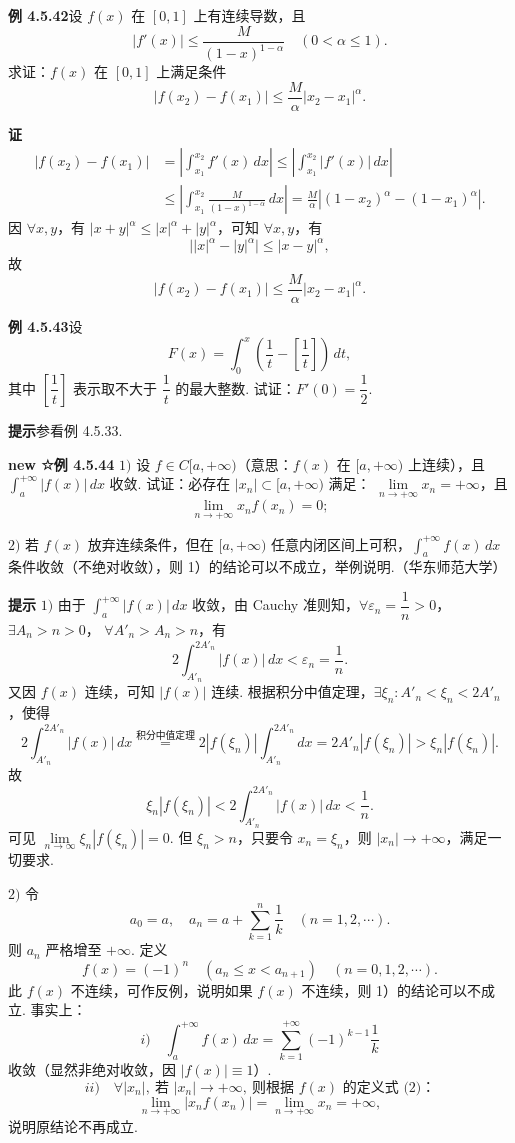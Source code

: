 \documentclass[UTF8,12pt,a4paper,fontset=fandol]{ctexart}
\begin{document}
\noindent\textbf{例 4.5.42}\quad 设 $f(x)$ 在 $[0,1]$ 上有连续导数，且
\[
|f'(x)|\le\frac{M}{(1-x)^{1-\alpha}}\quad(0<\alpha\le1).
\]
求证：$f(x)$ 在 $[0,1]$ 上满足条件
\[
|f(x_2)-f(x_1)|\le\frac M\alpha |x_2-x_1|^\alpha.
\]

\noindent\textbf{证}\quad
\[
\begin{aligned}
|f(x_2)-f(x_1)|
&=\left|\int_{x_1}^{x_2}f'(x)\,dx\right|
\le\left|\int_{x_1}^{x_2}|f'(x)|\,dx\right|\\
&\le\left|\int_{x_1}^{x_2}\frac M{(1-x)^{1-\alpha}}\,dx\right|
=\frac M\alpha\left|(1-x_2)^\alpha-(1-x_1)^\alpha\right|.
\end{aligned}
\]
因 $\forall x,y$，有 $|x+y|^\alpha\le |x|^\alpha+|y|^\alpha$，可知 $\forall x,y$，有
\[
\bigl||x|^\alpha-|y|^\alpha\bigr|\le |x-y|^\alpha,
\]
故
\[
|f(x_2)-f(x_1)|\le\frac M\alpha |x_2-x_1|^\alpha.
\]

\noindent\textbf{例 4.5.43}\quad 设
\[
F(x)=\int_0^x\left(\frac1t-\left[\frac1t\right]\right)\,dt,
\]
其中 $\left[\dfrac1t\right]$ 表示取不大于 $\dfrac1t$ 的最大整数. 试证：$F'(0)=\dfrac12$.

\noindent\textbf{提示}\quad 参看例 4.5.33.

\noindent\textbf{new ☆例 4.5.44}\quad
$1)$ 设 $f\in C[a,+\infty)$（意思：$f(x)$ 在 $[a,+\infty)$ 上连续），且
$\displaystyle\int_a^{+\infty}|f(x)|\,dx$ 收敛. 试证：必存在 $|x_n|\subset[a,+\infty)$ 满足：
$\lim\limits_{n\to+\infty}x_n=+\infty$，且
\[
\lim_{n\to+\infty}x_nf(x_n)=0;
\]

$2)$ 若 $f(x)$ 放弃连续条件，但在 $[a,+\infty)$ 任意内闭区间上可积，$\displaystyle\int_a^{+\infty}f(x)\,dx$ 条件收敛（不绝对收敛），则 1）的结论可以不成立，举例说明.（华东师范大学）

\noindent\textbf{提示}\quad
$1)$ 由于 $\displaystyle\int_a^{+\infty}|f(x)|\,dx$ 收敛，由 Cauchy 准则知，$\forall\varepsilon_n=\dfrac1n>0$，$\exists A_n>n>0$，
$\forall A'_n>A_n>n$，有
\begin{equation}
2\int_{A'_n}^{2A'_n}|f(x)|\,dx<\varepsilon_n=\frac1n. \tag{1}
\end{equation}
又因 $f(x)$ 连续，可知 $|f(x)|$ 连续. 根据积分中值定理，$\exists\xi_n:A'_n<\xi_n<2A'_n$，使得
\[
2\int_{A'_n}^{2A'_n}|f(x)|\,dx
\stackrel{\text{积分中值定理}}{=}2|f(\xi_n)|\int_{A'_n}^{2A'_n}dx
=2A'_n|f(\xi_n)|>\xi_n|f(\xi_n)|.
\]
故
\[
\xi_n|f(\xi_n)|<2\int_{A'_n}^{2A'_n}|f(x)|\,dx<\frac1n.
\]
可见 $\lim\limits_{n\to\infty}\xi_n|f(\xi_n)|=0$. 但 $\xi_n>n$，只要令 $x_n=\xi_n$，则 $|x_n|\to+\infty$，满足一切要求.

$2)$ 令
\[
a_0=a,\quad a_n=a+\sum_{k=1}^n\frac1k\quad(n=1,2,\cdots).
\]
则 $a_n$ 严格增至 $+\infty$. 定义
\begin{equation}
f(x)=(-1)^n\quad(a_n\le x<a_{n+1})\quad(n=0,1,2,\cdots). \tag{2}
\end{equation}
此 $f(x)$ 不连续，可作反例，说明如果 $f(x)$ 不连续，则 1）的结论可以不成立. 事实上：
\[
i)\quad \int_a^{+\infty}f(x)\,dx
=\sum_{k=1}^{+\infty}(-1)^{k-1}\frac1k
\]
收敛（显然非绝对收敛，因 $|f(x)|\equiv1$）.
\[
ii)\quad \forall |x_n|,\ \text{若 }|x_n|\to+\infty,\ \text{则根据 }f(x)\text{ 的定义式 (2)：}
\]
\[
\lim_{n\to+\infty}|x_nf(x_n)|=\lim_{n\to+\infty}x_n=+\infty,
\]
说明原结论不再成立.
\end{document}
